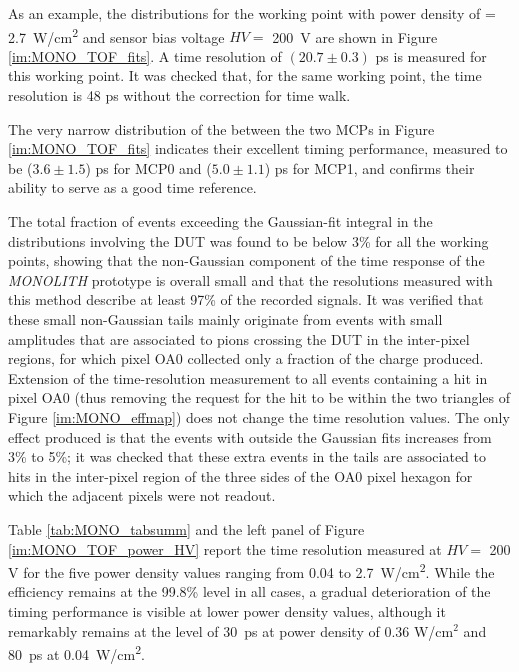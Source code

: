 		As an example, the \dtoa distributions for the working point with power density of \power = \SI{2.7}{\watt/\centi\meter^2} and sensor bias voltage $ HV =$ \SI{200}{\volt} are shown in Figure \ref{im:MONO_TOF_fits}.
		A time resolution of $(20.7\pm 0.3)$ ps is measured for this working point. It was checked that, for the same working point, the time resolution is 48 ps without the correction for time walk.

		The very narrow distribution of the \dtoa between the two MCPs in Figure \ref{im:MONO_TOF_fits} indicates their excellent timing performance, measured to be ($3.6\pm1.5$) ps for MCP0 and ($5.0\pm1.1$) ps for MCP1, and confirms their ability to serve as a good time reference. 

		The total fraction of events exceeding the Gaussian-fit integral in the \dtoa distributions involving the DUT was found to be below 3\% for all the working points, showing that the non-Gaussian component of the time response of the \textit{MONOLITH} prototype is overall small and that the resolutions measured with this method describe at least 97\% of the recorded signals. 
		It was verified that these small non-Gaussian tails mainly originate from events with small amplitudes that are associated to pions crossing the DUT in the inter-pixel regions, for which pixel OA0 collected only a fraction of the charge produced.
		Extension of the time-resolution measurement to all events containing a hit in pixel OA0 (thus removing the request for the hit to be within the two triangles of Figure \ref{im:MONO_effmap}) does not change the time resolution values. The only effect produced is that the events with \dtoa outside the Gaussian fits increases from 3\% to 5\%; it was checked that these extra events in the tails are associated to hits in the inter-pixel region of the three sides of the OA0 pixel hexagon for which the adjacent pixels were not readout.


		Table \ref{tab:MONO_tabsumm} and the left panel of Figure \ref{im:MONO_TOF_power_HV} report the time resolution measured at  $HV =$ 200 V for the five power density values ranging from 0.04 to \SI{2.7}{\watt/\centi\meter^2}. 
		While the efficiency remains at the 99.8\% level in all cases, a gradual deterioration of the timing performance is visible at lower power density values, although it remarkably remains at the level of \SI{30}{\pico\second} at power density of 0.36 W/cm$^2$ and \SI{80}{\pico\second} at \SI{0.04}{\watt/\centi\meter^2}. 

